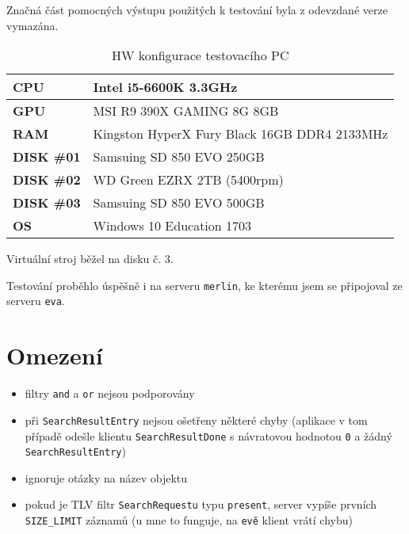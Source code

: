 \documentclass[a4paper, 11pt]{article}
\begin{document}
Značná část pomocných výstupu použitých k testování byla z odevzdané verze vymazána.

\begin{table}[h]
	\centering
	\label{mypc}
	\begin{tabular}{|l|l|}
		\hline
		\textbf{CPU}       & Intel i5-6600K 3.3GHz                        \\ \hline
		\textbf{GPU}       & MSI R9 390X GAMING 8G 8GB                    \\ \hline
		\textbf{RAM}       & Kingston HyperX Fury Black 16GB DDR4 2133MHz \\ \hline
		\textbf{DISK \#01} & Samsuing SD 850 EVO 250GB                    \\ \hline
		\textbf{DISK \#02} & WD Green EZRX 2TB (5400rpm)                  \\ \hline
		\textbf{DISK \#03} & Samsuing SD 850 EVO 500GB                    \\ \hline
		\textbf{OS}        & Windows 10 Education 1703                    \\ \hline
	\end{tabular}
	\caption{HW konfigurace testovacího PC}
\end{table}

Virtuální stroj běžel na disku č. 3.
\bigskip

Testování proběhlo úspěšně i na serveru \texttt{merlin}, ke kterému jsem se připojoval ze serveru \texttt{eva}.

\pagebreak


\section{Omezení}

\begin{itemize}
	\item filtry \texttt{and} a \texttt{or} nejsou podporovány

	\item při \texttt{SearchResultEntry} nejsou ošetřeny některé chyby (aplikace v tom případě odešle klientu \texttt{SearchResultDone} s návratovou hodnotou \texttt{0} a žádný \texttt{SearchResultEntry})
	
	\item ignoruje otázky na název objektu
	
	\item pokud je TLV filtr \texttt{SearchRequestu} typu \texttt{present}, server vypíše prvních \texttt{SIZE\_LIMIT} záznamů (u mne to funguje, na \texttt{evě} klient vrátí chybu)
\end{itemize}



\pagebreak


\nocite{*}

\end{document}
